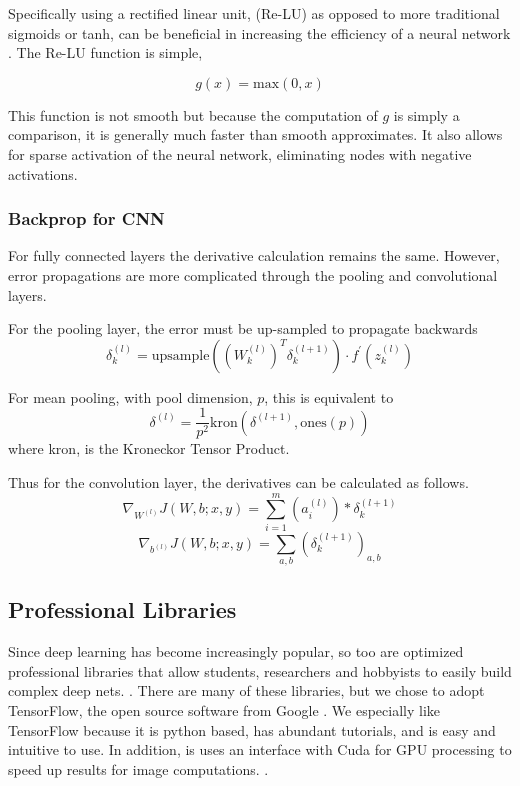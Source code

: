 \documentclass[12pt, twocolumn]{article}
\begin{document}
Specifically using a rectified linear unit, (Re-LU) as opposed to more traditional sigmoids or tanh, can be beneficial in increasing the efficiency of a neural network \cite{imagenet}. The Re-LU function is simple, 

\begin{equation}
g(x)= \textrm{max}(0,x)
\end{equation}

This function is not smooth but because the computation of $g$ is simply a comparison, it is generally much faster than smooth approximates. It also allows for sparse activation of the neural network, eliminating nodes with negative activations. 

\subsubsection{Backprop for CNN}
For fully connected layers  the derivative calculation remains the same. However,  error propagations are more complicated through the pooling and convolutional layers. 

For the pooling layer, the error must be up-sampled to propagate backwards
\begin{equation}
\delta^{(l)}_k=\textrm{upsample}((W^{(l)}_k)^T \delta^{(l+1)}_k) \cdot f^{\prime}(z^{(l)}_k)
\end{equation}


For mean pooling, with pool dimension, $p$, this is equivalent to 
\begin{equation}
\delta^{(l)}= \frac{1}{p^2}  \textrm{kron}(\delta^{(l+1)}, \textrm{ones}(p))
\end{equation}
where kron, is the Kroneckor Tensor Product.

Thus for the convolution layer, the derivatives can be calculated as follows.
\begin{equation}
\nabla_{W^{(l)}}J(W,b;x,y) = \sum_{i=1}^m (a^{(l)}_i) \ast  \delta^{(l+1)}_k
\end{equation}
\begin{equation}
\nabla_{b^{(l)}}J(W,b;x,y)= \sum_{a,b}(\delta^{(l+1)}_k)_{a,b}
\end{equation}


\subsection{Professional Libraries}

Since deep learning has become increasingly popular, so too are optimized professional libraries  that allow students, researchers and hobbyists to easily build complex deep nets. . There are many of these libraries, but we chose to adopt TensorFlow, the open source software from Google \cite{TensorFlowGH}. We especially like TensorFlow because it is python based, has abundant tutorials, and is easy and intuitive to use. In addition, is uses an interface with Cuda for GPU processing to speed up results for image computations. \cite{TensorFlowWeb}. 
\end{document}
